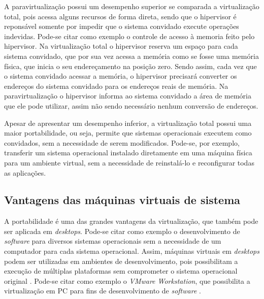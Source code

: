 
A paravirtualização possui um desempenho superior se comparada a virtualização total, pois acessa alguns recursos de forma direta, sendo que 
o hipervisor é reponsável somente por impedir que o sistema convidado execute operações indevidas. Pode-se citar como exemplo o controle de
acesso à memoria feito pelo hipervisor. Na virtualização total o hipervisor reserva um espaço para cada sistema convidado, que por sua vez 
acessa a memória como se fosse uma memória física, que inicia o seu endereçamento na posição zero. Sendo assim, cada vez que o sistema convidado 
acessar a memória, o hipervisor precisará converter os endereços do sistema convidado para os endereços reais de memória. Na paravirtualização 
o hipervisor informa ao sistema convidado a área de memória que ele pode utilizar, assim não sendo necessário nenhum conversão de endereços.

Apesar de apresentar um desempenho inferior, a virtualização total possui uma maior portabilidade, ou seja, permite que sistemas operacionais 
executem como convidados, sem a necessidade de serem modificados. Pode-se, por exemplo, transferir um sistema operacional instalado diretamente 
em uma máquina física para um ambiente virtual, sem a necessidade de reinstalá-lo e reconfigurar todas as aplicações.


\subsection{Vantagens das máquinas virtuais de sistema}
\label{section:virtvantag}

A portabilidade é uma das grandes vantagens da virtualização, que também pode ser aplicada em \textit{desktops}. Pode-se citar como exemplo 
o desenvolvimento de \textit{software} para diversos sistemas operacionais sem a necessidade de um computador para cada sistema operacional. 
Assim, máquinas virtuais em \textit{desktops} podem ser utilizadas em ambientes de desenvolvimento, pois possibilitam a execução de múltiplas 
plataformas sem comprometer o sistema operacional original \cite{carissimi2008}. Pode-se citar como exemplo o \textit{VMware Workstation}, que 
possibilita a virtualização em \ac{PC} para fins de desenvolvimento de \textit{software} \cite{vmware2016}.

